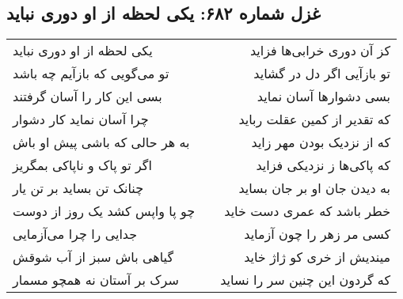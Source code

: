 \begin{center}
\section*{غزل شماره ۶۸۲: یکی لحظه از او دوری نباید}
\label{sec:0682}
\begin{longtable}{l p{0.5cm} r}
یکی لحظه از او دوری نباید
&&
کز آن دوری خرابی‌ها فزاید
\\
تو می‌گویی که بازآیم چه باشد
&&
تو بازآیی اگر دل در گشاید
\\
بسی این کار را آسان گرفتند
&&
بسی دشوارها آسان نماید
\\
چرا آسان نماید کار دشوار
&&
که تقدیر از کمین عقلت رباید
\\
به هر حالی که باشی پیش او باش
&&
که از نزدیک بودن مهر زاید
\\
اگر تو پاک و ناپاکی بمگریز
&&
که پاکی‌ها ز نزدیکی فزاید
\\
چنانک تن بساید بر تن یار
&&
به دیدن جان او بر جان بساید
\\
چو پا واپس کشد یک روز از دوست
&&
خطر باشد که عمری دست خاید
\\
جدایی را چرا می‌آزمایی
&&
کسی مر زهر را چون آزماید
\\
گیاهی باش سبز از آب شوقش
&&
میندیش از خری کو ژاژ خاید
\\
سرک بر آستان نه همچو مسمار
&&
که گردون این چنین سر را نساید
\\
\end{longtable}
\end{center}
